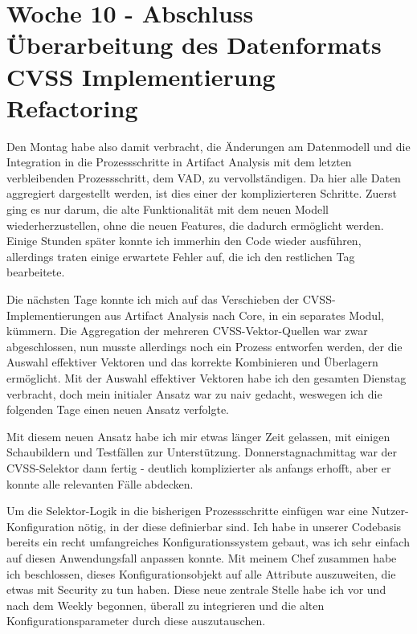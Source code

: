 \section{Woche 10 - Abschluss Überarbeitung des Datenformats \headerand CVSS Implementierung Refactoring} \label{sec:bericht-wo-10}


\lweekdaymarginpar{\weekdayMondayLong}

Den Montag habe also damit verbracht, die Änderungen am Datenmodell und die Integration in die Prozessschritte in Artifact Analysis mit dem letzten verbleibenden Prozessschritt, dem VAD, zu vervollständigen\@.
Da hier alle Daten aggregiert dargestellt werden, ist dies einer der komplizierteren Schritte.
Zuerst ging es nur darum, die alte Funktionalität mit dem neuen Modell wiederherzustellen, ohne die neuen Features, die dadurch ermöglicht werden.
Einige Stunden später konnte ich immerhin den Code wieder ausführen, allerdings traten einige erwartete Fehler auf, die ich den restlichen Tag bearbeitete.

\sweekdaymarginpar{\weekdayTuesdayLong}

Die nächsten Tage konnte ich mich auf das Verschieben der CVSS-Implementierungen aus Artifact Analysis nach Core, in ein separates Modul, kümmern.
Die Aggregation der mehreren CVSS-Vektor-Quellen war zwar abgeschlossen, nun musste allerdings noch ein Prozess entworfen werden, der die Auswahl effektiver Vektoren und das korrekte Kombinieren und Überlagern ermöglicht.
Mit der Auswahl effektiver Vektoren habe ich den gesamten Dienstag verbracht, doch mein initialer Ansatz war zu naiv gedacht, weswegen ich die folgenden Tage einen neuen Ansatz verfolgte.

\sweekdaymarginpar{\weekdayWednesdayShort, \weekdayThursdayShort}

Mit diesem neuen Ansatz habe ich mir etwas länger Zeit gelassen, mit einigen Schaubildern und Testfällen zur Unterstützung.
Donnerstagnachmittag war der CVSS-Selektor dann fertig - deutlich komplizierter als anfangs erhofft, aber er konnte alle relevanten Fälle abdecken.

\sweekdaymarginpar{\weekdayFridayLong}

Um die Selektor-Logik in die bisherigen Prozessschritte einfügen war eine Nutzer-Konfiguration nötig, in der diese definierbar sind.
Ich habe in unserer Codebasis bereits ein recht umfangreiches Konfigurationssystem gebaut, was ich sehr einfach auf diesen Anwendungsfall anpassen konnte.
Mit meinem Chef zusammen habe ich beschlossen, dieses Konfigurationsobjekt auf alle Attribute auszuweiten, die etwas mit Security zu tun haben.
Diese neue zentrale Stelle habe ich vor und nach dem Weekly begonnen, überall zu integrieren und die alten Konfigurationsparameter durch diese auszutauschen.
